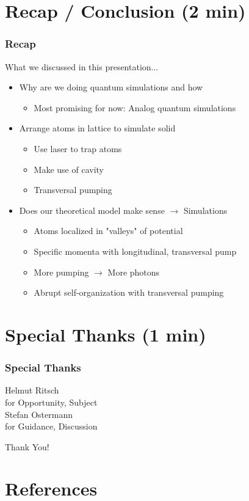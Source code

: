 \documentclass[pdflatex,compress]{beamer}
\begin{document}
\section{Recap / Conclusion (2 min)}

\begin{frame}
\frametitle{Recap}
What we discussed in this presentation...
\begin{itemize}
	\item Why are we doing quantum simulations and how
		\begin{itemize}
			\item Most promising for now: Analog quantum simulations
		\end{itemize}
	\item Arrange atoms in lattice to simulate solid
		\begin{itemize}
			\item Use laser to trap atoms
			\item Make use of cavity
			\item Transversal pumping
		\end{itemize}
	\item Does our theoretical model make sense $\rightarrow$ Simulations
		\begin{itemize}
			\item Atoms localized in "valleys" of potential
			\item Specific momenta with longitudinal, transversal pump
			\item More pumping $\rightarrow$ More photons
			\item Abrupt self-organization with transversal pumping
		\end{itemize}
\end{itemize}
\end{frame}

\section{Special Thanks (1 min)}

\begin{frame}
\frametitle{Special Thanks}
\begin{center}
\huge Helmut Ritsch \\
\small for Opportunity, Subject \\
\vspace{2em}
\huge Stefan Ostermann \\
\small for Guidance, Discussion
\end{center}
\end{frame}

\begin{frame}
\begin{center}
\huge Thank You!
\end{center}
\end{frame}

\section{References}

\begin{frame}[allowframebreaks]


\end{frame}
\end{document}
